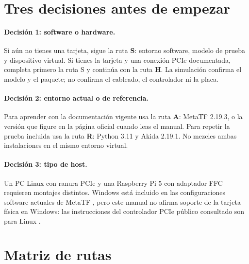 \section{Tres decisiones antes de empezar}

\paragraph{Decisión 1: software o hardware.}
Si aún no tienes una tarjeta, sigue la ruta \textbf{S}: entorno software, modelo de prueba y
dispositivo virtual. Si tienes la tarjeta y una conexión PCIe documentada, completa primero la
ruta S y continúa con la ruta \textbf{H}. La simulación confirma el modelo y el paquete; no
confirma el cableado, el controlador ni la placa.


\paragraph{Decisión 2: entorno actual o de referencia.}
Para aprender con la documentación vigente usa la ruta \textbf{A}: MetaTF 2.19.3, o la versión
que figure en la página oficial cuando leas el manual. Para repetir la prueba incluida usa la ruta
\textbf{R}: Python 3.11 y Akida 2.19.1.
No mezcles ambas instalaciones
en el mismo entorno virtual.


\paragraph{Decisión 3: tipo de host.}
Un PC Linux con ranura PCIe y una Raspberry Pi 5 con adaptador FFC requieren montajes distintos.
Windows está incluido en las configuraciones software actuales de MetaTF
\cite{brainchip_install_2193}, pero este manual no afirma soporte de la tarjeta física en
Windows: las instrucciones del controlador PCIe público consultado son para Linux
\cite{brainchip_driver}.


\section{Matriz de rutas}

